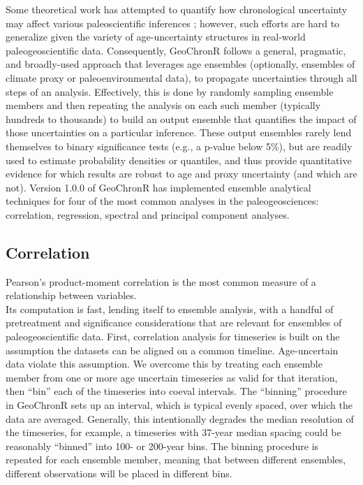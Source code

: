 \documentclass[gchron, manuscript]{copernicus}
\begin{document}
Some theoretical work has attempted to quantify how chronological uncertainty may affect various paleoscientific inferences \citep[e.g.][]{HuybersWunsch2004}; however, such efforts are hard to generalize given the variety of age-uncertainty structures in real-world paleogeoscientific data.
Consequently, GeoChronR follows a general, pragmatic, and broadly-used approach that leverages age ensembles (optionally, ensembles of climate proxy or paleoenvironmental data), to propagate uncertainties through all steps of an analysis. Effectively, this is done by randomly sampling ensemble members and then repeating the analysis on each such member (typically hundreds to thousands) to build an output ensemble that quantifies the impact of those uncertainties on a particular inference.
These output ensembles rarely lend themselves to binary significance tests (e.g., a p-value below 5\%), but are readily used to estimate probability densities or quantiles, and thus provide quantitative evidence for which results are robust to age and proxy uncertainty (and which are not). Version 1.0.0 of GeoChronR has implemented ensemble analytical techniques for four of the most common analyses in the paleogeosciences: correlation, regression, spectral and principal component analyses.

\subsection{Correlation}

Pearson's product-moment correlation is the most common measure of a relationship between variables.\\
Its computation is fast, lending itself to ensemble analysis, with a handful of pretreatment and significance considerations that are relevant for ensembles of paleogeoscientific data.
First, correlation analysis for timeseries is built on the assumption the datasets can be aligned on a common timeline.
Age-uncertain data violate this assumption.
We overcome this by treating each ensemble member from one or more age uncertain timeseries as valid for that iteration, then ``bin'' each of the timeseries into coeval intervals.
The ``binning'' procedure in GeoChronR sets up an interval, which is typical evenly spaced, over which the data are averaged.
Generally, this intentionally degrades the median resolution of the timeseries, for example, a timeseries with 37-year median spacing could be reasonably ``binned'' into 100- or 200-year bins.
The binning procedure is repeated for each ensemble member, meaning that between different ensembles, different observations will be placed in different bins.
\end{document}
